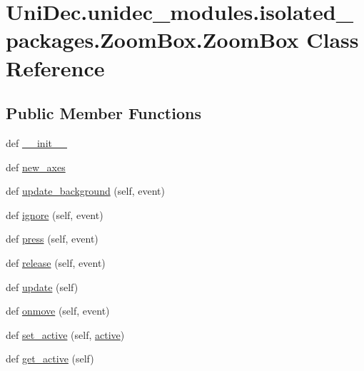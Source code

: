 \hypertarget{class_uni_dec_1_1unidec__modules_1_1isolated__packages_1_1_zoom_box_1_1_zoom_box}{}\section{Uni\+Dec.\+unidec\+\_\+modules.\+isolated\+\_\+packages.\+Zoom\+Box.\+Zoom\+Box Class Reference}
\label{class_uni_dec_1_1unidec__modules_1_1isolated__packages_1_1_zoom_box_1_1_zoom_box}
\subsection*{Public Member Functions}
\begin{DoxyCompactItemize}
\item 
def \hyperlink{class_uni_dec_1_1unidec__modules_1_1isolated__packages_1_1_zoom_box_1_1_zoom_box_a7537f4713e94995156ee0443ed328aa4}{\+\_\+\+\_\+init\+\_\+\+\_\+}
\item 
def \hyperlink{class_uni_dec_1_1unidec__modules_1_1isolated__packages_1_1_zoom_box_1_1_zoom_box_a7a1f9d4bbb1803d140ba235b8c64a6e7}{new\+\_\+axes}
\item 
def \hyperlink{class_uni_dec_1_1unidec__modules_1_1isolated__packages_1_1_zoom_box_1_1_zoom_box_aecba22db4b0aaf71c2275eb199e4a335}{update\+\_\+background} (self, event)
\item 
def \hyperlink{class_uni_dec_1_1unidec__modules_1_1isolated__packages_1_1_zoom_box_1_1_zoom_box_aca518ee2d601c8c59885022b3c13f875}{ignore} (self, event)
\item 
def \hyperlink{class_uni_dec_1_1unidec__modules_1_1isolated__packages_1_1_zoom_box_1_1_zoom_box_a9b9a4cb837c3f51cd9a402b7bb188214}{press} (self, event)
\item 
def \hyperlink{class_uni_dec_1_1unidec__modules_1_1isolated__packages_1_1_zoom_box_1_1_zoom_box_a52e2cbe1fa2d57e479ec39e16ea597cb}{release} (self, event)
\item 
def \hyperlink{class_uni_dec_1_1unidec__modules_1_1isolated__packages_1_1_zoom_box_1_1_zoom_box_ae8ea5827cbbfcf8b3c5f079d7acb0890}{update} (self)
\item 
def \hyperlink{class_uni_dec_1_1unidec__modules_1_1isolated__packages_1_1_zoom_box_1_1_zoom_box_a608d927febf1e5b833cc9e6d9d13d27c}{onmove} (self, event)
\item 
def \hyperlink{class_uni_dec_1_1unidec__modules_1_1isolated__packages_1_1_zoom_box_1_1_zoom_box_ab809136a44cd0c5901611bbb9d2b4d97}{set\+\_\+active} (self, \hyperlink{class_uni_dec_1_1unidec__modules_1_1isolated__packages_1_1_zoom_box_1_1_zoom_box_abee2378adeba5f6c7bdc1c02b6d07adc}{active})
\item 
def \hyperlink{class_uni_dec_1_1unidec__modules_1_1isolated__packages_1_1_zoom_box_1_1_zoom_box_ad4dd4e92d7c50ecedb38089e645a3245}{get\+\_\+active} (self)
\end{DoxyCompactItemize}
